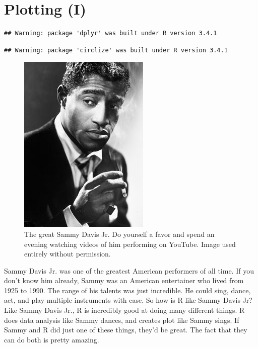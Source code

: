 \documentclass[]{book}
\theoremstyle{definition}
\theoremstyle{definition}
\theoremstyle{remark}
\begin{document}
\chapter{Plotting (I)}\label{plotting1}

\begin{verbatim}
## Warning: package 'dplyr' was built under R version 3.4.1
\end{verbatim}

\begin{verbatim}
## Warning: package 'circlize' was built under R version 3.4.1
\end{verbatim}

\begin{figure}

{\centering \includegraphics[width=0.5\linewidth]{images/sammy} 

}

\caption{The great Sammy Davis Jr. Do yourself a favor and spend an evening watching videos of him performing on YouTube. Image used entirely without permission.}\label{fig:sammy}
\end{figure}

Sammy Davis Jr. was one of the greatest American performers of all time.
If you don't know him already, Sammy was an American entertainer who
lived from 1925 to 1990. The range of his talents was just incredible.
He could sing, dance, act, and play multiple instruments with ease. So
how is R like Sammy Davis Jr? Like Sammy Davis Jr., R is incredibly good
at doing many different things. R does data analysis like Sammy dances,
and creates plot like Sammy sings. If Sammy and R did just one of these
things, they'd be great. The fact that they can do both is pretty
amazing.
\end{document}
